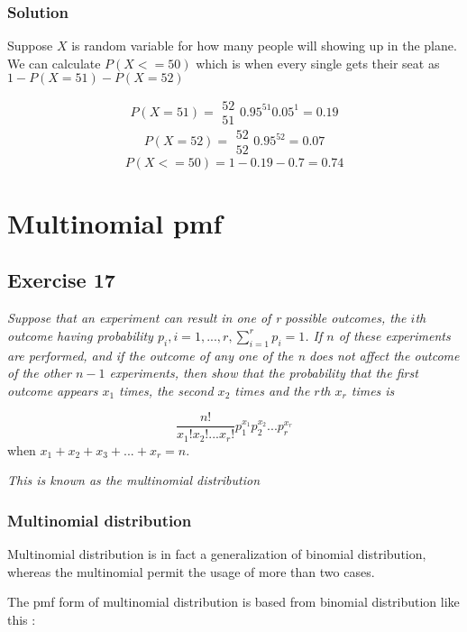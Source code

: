\documentclass[12pt,a4paper]{article}
\begin{document}
\subsubsection{Solution}

Suppose $X$ is random variable for how many people will showing up in the plane. We can calculate $P(X<=50)$ which is when every single gets their seat as $1 - P(X=51) - P(X=52)$

\[
P(X=51) = \begin{array}{c}52\\51\end{array}0.95^{51}  0.05^1 = 0.19
\]
\[
P(X=52) = \begin{array}{c}52\\52\end{array}0.95^{52} = 0.07
\]
\[
P(X<=50) = 1 - 0.19 - 0.7 = 0.74
\]


\section{Multinomial pmf}

\subsection{Exercise 17}

\textit{Suppose that an experiment can result in one of r possible outcomes, the $i$th outcome having probability $p_i, i = 1, ..., r, \sum\limits_{i=1}^r p_i = 1$. If $n$ of these experiments are performed, and if the outcome of any one of the n does not affect the outcome of the other $n-1$ experiments, then show that the probability that the first outcome appears $x_1$ times, the second $x_2$ times and the $r$th $x_r$ times is}

\[
\frac{n!}{x_1! x_2! ... x_r!} 
p_1^{x_1} p_2^{x_2} ... p_r^{x_r}
\]
when $x_1 + x_2 + x_3 + ... + x_r = n$.

\textit{This is known as the \textit{multinomial} distribution}

\subsubsection{Multinomial distribution}

Multinomial distribution is in fact a generalization of binomial distribution, whereas the multinomial permit the usage of more than two cases.

The pmf form of multinomial distribution is based from binomial distribution like this :
\end{document}
